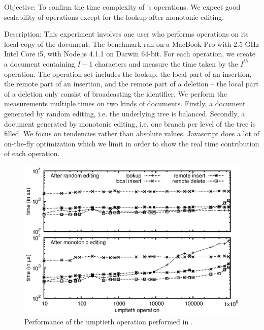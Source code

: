 \begin{asparadesc}
\item [Objective:] To confirm the time complexity of \LSEQ's operations. We
  expect good scalability of operations except for the lookup after monotonic
  editing.
\item [Description:] This experiment involves one user who performs operations
  on its local copy of the document. The benchmark ran on a MacBook Pro with 2.5
  GHz Intel Core i5, with Node.js 4.1.1 on Darwin 64-bit. For each operation, we
  create a document containing $I-1$ characters and measure the time taken by
  the $I^{th}$ operation. The operation set includes the lookup, the local part
  of an insertion, the remote part of an insertion, and the remote part of a
  deletion -- the local part of a deletion only consist of broadcasting the
  identifier. We perform the measurements multiple times on two kinds of
  documents. Firstly, a document generated by random editing, i.e. the
  underlying \LSEQ tree is balanced. Secondly, a document generated by monotonic
  editing, i.e. one branch per level of the \LSEQ tree is filled.  We focus on
  tendencies rather than absolute values. Javascript does a lot of on-the-fly
  optimization which we limit in order to show the real time contribution of
  each operation.

\begin{figure}
  \centering
  \includegraphics[width=\FIGUREWIDTH\textwidth]{./img/time.eps}
  \caption{\label{fig:time} Performance of the umptieth operation performed in
    \LSEQ.}
\end{figure}


\end{asparadesc}

